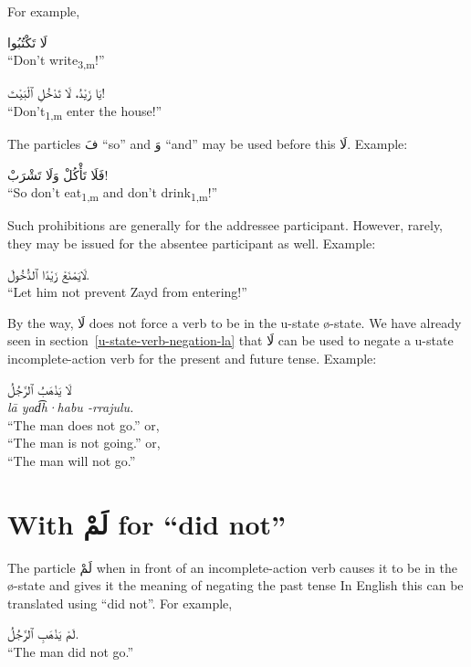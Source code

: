 \documentclass[
  10pt,
]{book}
\begin{document}
For example,

\foreignlanguage{arabic}{لَا تَکْتُبُوا}\\
\enquote{Don't write\textsubscript{3,m}!}

\foreignlanguage{arabic}{يَا زَيْدُ، لَا تَدْخُلِ ٱلْبَيْتَ!}\\
\enquote{Don't\textsubscript{1,m} enter the house!}

The particles \foreignlanguage{arabic}{فَ} \enquote{so} and \foreignlanguage{arabic}{وَ} \enquote{and} may be used before this \foreignlanguage{arabic}{لَا}.
Example:

\foreignlanguage{arabic}{فَلَا تَأْکُلْ وَلَا تَشْرَبْ!}\\
\enquote{So don't eat\textsubscript{1,m} and don't drink\textsubscript{1,m}!}

Such prohibitions are generally for the addressee participant.
However, rarely, they may be issued for the absentee participant as well. Example:

\foreignlanguage{arabic}{لَايَمْنَعْ زَيْدًا ٱلدُّخُولَ.}\\
\enquote{Let him not prevent Zayd from entering!}

By the way, \foreignlanguage{arabic}{لَا} does not force a verb to be in the u-state
ø-state. We have already seen in
section~\ref{u-state-verb-negation-la}
that \foreignlanguage{arabic}{لَا} can be used to negate a u-state incomplete-action verb for the present and future tense.
Example:

\foreignlanguage{arabic}{لَا يَذْهَبُ ٱلرَّجُلُ}\\
\emph{lā yad͡h·habu -rrajulu.}\\
\enquote{The man does not go.} or,\\
\enquote{The man is not going.} or,\\
\enquote{The man will not go.}

\section{\texorpdfstring{With \foreignlanguage{arabic}{لَمْ} for \enquote{did not}}{With لَمْ for ``did not''}}\label{with-ux644ux645-for-did-not}

The particle \foreignlanguage{arabic}{لَمْ} when in front of an
incomplete-action verb
causes it to be in the
ø-state
and gives it the meaning of
negating the past tense
In English this can be translated using \enquote{did not}.
For example,

\foreignlanguage{arabic}{لَمْ يَذْهَبِ ٱلرَّجُلُ.}\\
\enquote{The man did not go.}
\end{document}

